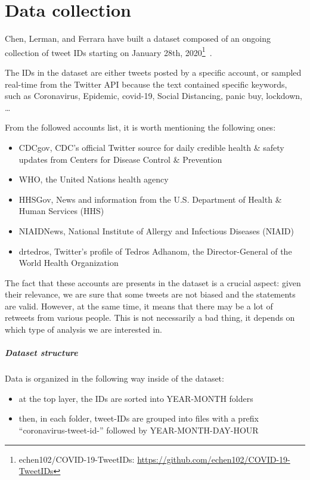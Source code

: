 \graphicspath{{chapters/chapter2/img/}}

\chapter{Data collection}
\label{cha:data}
Chen, Lerman, and Ferrara have built a dataset composed of an ongoing collection of tweet IDs starting on January 28th, 2020\footnote{echen102/COVID-19-TweetIDs: \url{https://github.com/echen102/COVID-19-TweetIDs}}~\cite{chen2020tracking}.

The IDs in the dataset are either tweets posted by a specific account, or sampled real-time from the Twitter API because the text contained specific keywords, such as Coronavirus, Epidemic, covid-19, Social Distancing, panic buy, lockdown, \ldots 

From the followed accounts list, it is worth mentioning the following ones:
\begin{itemize}
	\item CDCgov, CDC's official Twitter source for daily credible health \& safety updates from Centers for Disease Control \& Prevention
	\item WHO, the United Nations health agency
	\item HHSGov, News and information from the U.S. Department of Health \& Human Services (HHS)
	\item NIAIDNews, National Institute of Allergy and Infectious Diseases (NIAID)
	\item drtedros, Twitter's profile of Tedros Adhanom, the Director-General of the World Health Organization
\end{itemize}

The fact that these accounts are presents in the dataset is a crucial aspect: given their relevance, we are sure that some tweets are not biased and the statements are valid. However, at the same time, it means that there may be a lot of retweets from various people. This is not necessarily a bad thing, it depends on which type of analysis we are interested in.

\paragraph{Dataset structure}

Data is organized in the following way inside of the dataset:

\begin{itemize}
	\item at the top layer, the IDs are sorted into YEAR-MONTH folders
	\item then, in each folder, tweet-IDs are grouped into files with a prefix “coronavirus-tweet-id-” followed by YEAR-MONTH-DAY-HOUR
\end{itemize}


